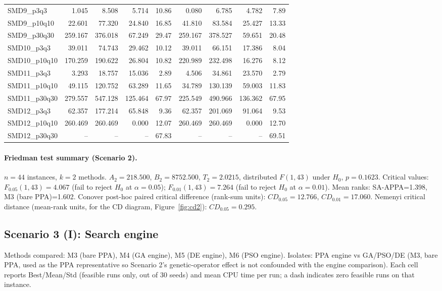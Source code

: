 \begin{longtable}{lrrrrrrrr}
SMD9\_p3q3 & 1.045 & 8.508 & 5.714 & 10.86 & 0.080 & 6.785 & 4.782 & 7.89 \\
SMD9\_p10q10 & 22.601 & 77.320 & 24.840 & 16.85 & 41.810 & 83.584 & 25.427 & 13.33 \\
SMD9\_p30q30 & 259.167 & 376.018 & 67.249 & 29.47 & 259.167 & 378.527 & 59.651 & 20.48 \\
SMD10\_p3q3 & 39.011 & 74.743 & 29.462 & 10.12 & 39.011 & 66.151 & 17.386 & 8.04 \\
SMD10\_p10q10 & 170.259 & 190.622 & 26.804 & 10.82 & 220.989 & 232.498 & 16.276 & 8.12 \\
SMD11\_p3q3 & 3.293 & 18.757 & 15.036 & 2.89 & 4.506 & 34.861 & 23.570 & 2.79 \\
SMD11\_p10q10 & 49.115 & 120.752 & 63.289 & 11.65 & 34.789 & 130.139 & 59.003 & 11.83 \\
SMD11\_p30q30 & 279.557 & 547.128 & 125.464 & 67.97 & 225.549 & 490.966 & 136.362 & 67.95 \\
SMD12\_p3q3 & 62.357 & 177.214 & 65.848 & 9.36 & 62.357 & 201.069 & 91.064 & 9.53 \\
SMD12\_p10q10 & 260.469 & 260.469 & 0.000 & 12.07 & 260.469 & 260.469 & 0.000 & 12.70 \\
SMD12\_p30q30 & -- & -- & -- & 67.83 & -- & -- & -- & 69.51 \\
\end{longtable}
\endgroup

\paragraph{Friedman test summary (Scenario 2).}
$n=44$ instances, $k=2$ methods. $A_2=218.500$, $B_2=8752.500$, $T_2=2.0215$, distributed $F(1,43)$ under $H_0$, $p=0.1623$. Critical values: $F_{0.05}(1,43)=4.067$ (fail to reject $H_0$ at $\alpha=0.05$); $F_{0.01}(1,43)=7.264$ (fail to reject $H_0$ at $\alpha=0.01$). Mean ranks: SA-APPA=1.398, M3 (bare PPA)=1.602. Conover post-hoc paired critical difference (rank-sum units): $CD_{0.05}=12.766$, $CD_{0.01}=17.060$. Nemenyi critical distance (mean-rank units, for the CD diagram, Figure~\ref{fig:cd2}): $CD_{0.05}=0.295$.

\subsection{Scenario 3 (I): Search engine}
\label{app:scenario3}
Methods compared: M3 (bare PPA), M4 (GA engine), M5 (DE engine), M6 (PSO engine). Isolates: PPA engine vs GA/PSO/DE (M3, bare PPA, used as the PPA representative so Scenario 2's genetic-operator effect is not confounded with the engine comparison). Each cell reports Best/Mean/Std (feasible runs only, out of 30 seeds) and mean CPU time per run; a dash indicates zero feasible runs on that instance.

